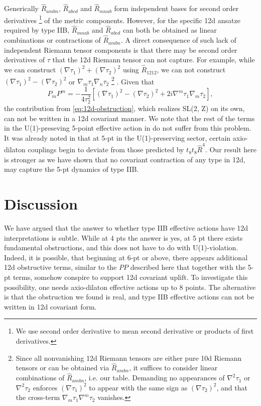 Generically $\widehat{R}_{ambn}$, $\widehat{R}_{abcd}$ and $\widehat{R}_{mnab}$ form independent bases for second order derivatives \footnote{We use second order derivative to mean second derivative or products of first derivatives.} of the metric components.
However, for the specific 12d ansatze required by type IIB, $\widehat{R}_{mnab}$ and $\widehat{R}_{abcd}$ can both be obtained as linear combinations or contractions of $\widehat{R}_{ambn}$.
A direct consequence of such lack of independent Riemann tensor components is that there may be second order derivatives of $\tau$ that the 12d Riemann tensor can not capture.
For example, while we can construct $(\nabla \tau_1)^2 + (\nabla \tau_2)^2$ using $\widehat{R}_{1212}$, we can not construct $(\nabla \tau_1)^2 - (\nabla \tau_2)^2$
or $\nabla_m \tau_1 \nabla_n \tau_2$
\footnote{
    Since all nonvanishing 12d Riemann tensors are either pure 10d Riemann tensors or can be obtained via $\widehat{R}_{ambn}$, it suffices to consider linear combinations of $\widehat{R}_{ambn}$, i.e. our table. Demanding no appearances of $\nabla^2 \tau_1$ or $\nabla^2 \tau_2$ enforces $(\nabla \tau_1)^2$ to appear with the same sign as $(\nabla \tau_2)^2$, and that the cross-term $\nabla_m \tau_1 \nabla^m \tau_2$ vanishes.
}
.
Given that
\begin{equation}
P_m P^m = -\frac{1}{4\tau_2^2} 
\left[
    (\nabla\tau_1)^2 - (\nabla\tau_2)^2 + 2i \nabla^m \tau_1 \nabla_m \tau_2
\right],
\end{equation}
the contribution from \eqref{eq:12d-obstruction}, which realizes SL(2, Z) on its own, can not be written in a 12d covariant manner.
We note that the rest of the terms in the U(1)-preseving 5-point effective action in \cite{Liu:2025uqu} do not suffer from this problem.
It was already noted in \cite{Liu:2025uqu} that at 5-pt in the U(1)-preserving sector, certain axio-dilaton couplings begin to deviate from those predicted by $t_8t_8 \widehat{R}^4$.
Our result here is stronger as we have shown that no covariant contraction of any type in 12d, may capture the 5-pt dynamics of type IIB.

\section{Discussion}
We have argued that the answer to whether type IIB effective actions have 12d interpretations is subtle.
While at 4 pts the answer is yes, at 5 pt there exists fundamental obstructions, and this does not have to do with U(1)-violation.
Indeed, it is possible, that beginning at 6-pt or above, there appears additional 12d obstructive terms, similar to the $PP$ described here that together with the 5-pt terms, somehow conspire to support 12d covariant uplift.
To investigate this possibility, one needs axio-dilaton effective actions up to 8 points.
The alternative is that the obstruction we found is real, and type IIB effective actions can not be written in 12d covariant form.


